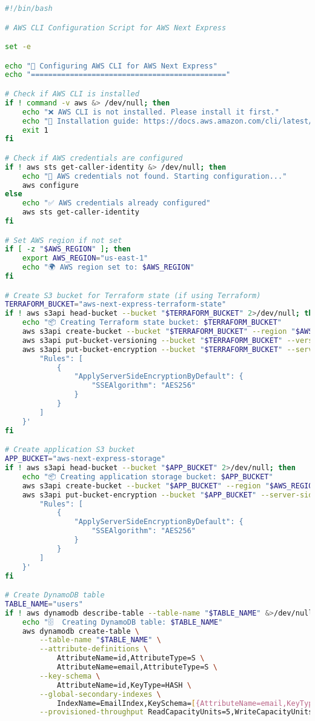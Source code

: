 \begin{lstlisting}[language=bash, caption=aws-config.sh]
#!/bin/bash

# AWS CLI Configuration Script for AWS Next Express

set -e

echo "🔧 Configuring AWS CLI for AWS Next Express"
echo "============================================="

# Check if AWS CLI is installed
if ! command -v aws &> /dev/null; then
    echo "❌ AWS CLI is not installed. Please install it first."
    echo "📖 Installation guide: https://docs.aws.amazon.com/cli/latest/userguide/getting-started-install.html"
    exit 1
fi

# Check if AWS credentials are configured
if ! aws sts get-caller-identity &> /dev/null; then
    echo "🔑 AWS credentials not found. Starting configuration..."
    aws configure
else
    echo "✅ AWS credentials already configured"
    aws sts get-caller-identity
fi

# Set AWS region if not set
if [ -z "$AWS_REGION" ]; then
    export AWS_REGION="us-east-1"
    echo "🌍 AWS region set to: $AWS_REGION"
fi

# Create S3 bucket for Terraform state (if using Terraform)
TERRAFORM_BUCKET="aws-next-express-terraform-state"
if ! aws s3api head-bucket --bucket "$TERRAFORM_BUCKET" 2>/dev/null; then
    echo "📦 Creating Terraform state bucket: $TERRAFORM_BUCKET"
    aws s3api create-bucket --bucket "$TERRAFORM_BUCKET" --region "$AWS_REGION"
    aws s3api put-bucket-versioning --bucket "$TERRAFORM_BUCKET" --versioning-configuration Status=Enabled
    aws s3api put-bucket-encryption --bucket "$TERRAFORM_BUCKET" --server-side-encryption-configuration '{
        "Rules": [
            {
                "ApplyServerSideEncryptionByDefault": {
                    "SSEAlgorithm": "AES256"
                }
            }
        ]
    }'
fi

# Create application S3 bucket
APP_BUCKET="aws-next-express-storage"
if ! aws s3api head-bucket --bucket "$APP_BUCKET" 2>/dev/null; then
    echo "📦 Creating application storage bucket: $APP_BUCKET"
    aws s3api create-bucket --bucket "$APP_BUCKET" --region "$AWS_REGION"
    aws s3api put-bucket-encryption --bucket "$APP_BUCKET" --server-side-encryption-configuration '{
        "Rules": [
            {
                "ApplyServerSideEncryptionByDefault": {
                    "SSEAlgorithm": "AES256"
                }
            }
        ]
    }'
fi

# Create DynamoDB table
TABLE_NAME="users"
if ! aws dynamodb describe-table --table-name "$TABLE_NAME" &>/dev/null; then
    echo "🗄️  Creating DynamoDB table: $TABLE_NAME"
    aws dynamodb create-table \
        --table-name "$TABLE_NAME" \
        --attribute-definitions \
            AttributeName=id,AttributeType=S \
            AttributeName=email,AttributeType=S \
        --key-schema \
            AttributeName=id,KeyType=HASH \
        --global-secondary-indexes \
            IndexName=EmailIndex,KeySchema=[{AttributeName=email,KeyType=HASH}],Projection={ProjectionType=ALL},ProvisionedThroughput={ReadCapacityUnits=5,WriteCapacityUnits=5} \
        --provisioned-throughput ReadCapacityUnits=5,WriteCapacityUnits=5
    

\end{lstlisting}
